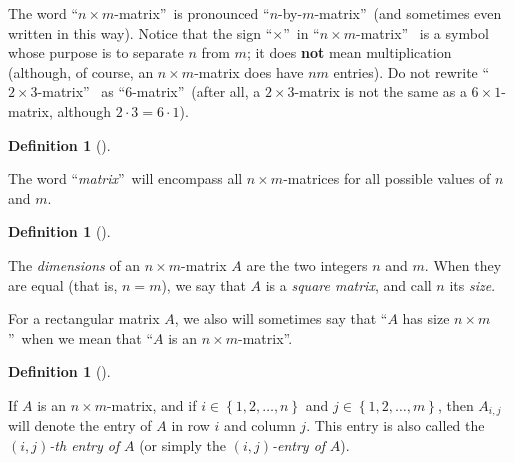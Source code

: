 \documentclass[numbers=enddot,12pt,final,onecolumn,notitlepage]{scrartcl}%
\theoremstyle{definition}
\newtheorem{defi}[theo]{Definition}
\newenvironment{definition}[1][]
{\begin{defi}[#1]\begin{leftbar}}
{\end{leftbar}\end{defi}}
\begin{document}
The word \textquotedblleft$n\times m$-matrix\textquotedblright\ is pronounced
\textquotedblleft$n$-by-$m$-matrix\textquotedblright\ (and sometimes even
written in this way). Notice that the sign \textquotedblleft$\times
$\textquotedblright\ in \textquotedblleft$n\times m$-matrix\textquotedblright%
\ is a symbol whose purpose is to separate $n$ from $m$; it does \textbf{not}
mean multiplication (although, of course, an $n\times m$-matrix does have $nm$
entries). Do not rewrite \textquotedblleft$2\times3$-matrix\textquotedblright%
\ as \textquotedblleft$6$-matrix\textquotedblright\ (after all, a $2\times
3$-matrix is not the same as a $6\times1$-matrix, although $2\cdot3=6\cdot1$).

\begin{definition}
The word \textquotedblleft\textit{matrix}\textquotedblright\ will encompass
all $n\times m$-matrices for all possible values of $n$ and $m$.
\end{definition}

\begin{definition}
The \textit{dimensions} of an $n\times m$-matrix $A$ are the two integers $n$
and $m$. When they are equal (that is, $n=m$), we say that $A$ is a
\textit{square matrix}, and call $n$ its \textit{size}.

For a rectangular matrix $A$, we also will sometimes say that
\textquotedblleft$A$ has size $n\times m$\textquotedblright\ when we mean that
\textquotedblleft$A$ is an $n\times m$-matrix\textquotedblright.
\end{definition}

\begin{definition}
If $A$ is an $n\times m$-matrix, and if $i\in\left\{  1,2,\ldots,n\right\}  $
and $j\in\left\{  1,2,\ldots,m\right\}  $, then $A_{i,j}$ will denote the
entry of $A$ in row $i$ and column $j$. This entry is also called the $\left(
i,j\right)  $\textit{-th entry of }$A$ (or simply the $\left(  i,j\right)
$\textit{-entry of }$A$).
\end{definition}
\end{document}
